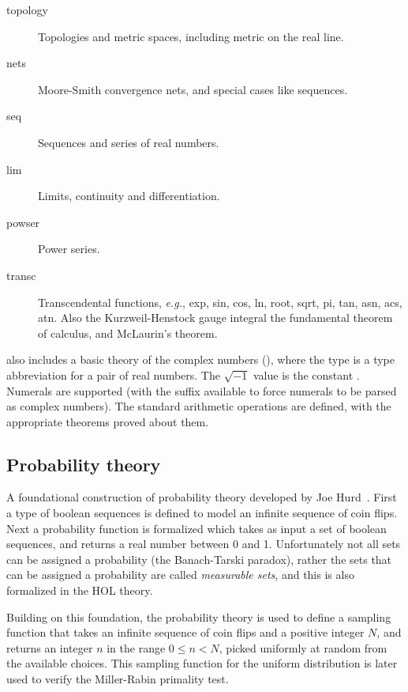 \begin{description}
\item [topology] Topologies and metric spaces, including metric on
the real line.
\item [nets] Moore-Smith convergence nets, and special cases like
sequences.
\item [seq] Sequences and series of real numbers.
\item [lim] Limits, continuity and differentiation.
\item [powser] Power series.
\item [transc] Transcendental functions, \emph{e.g.}, exp, sin,
cos, ln, root, sqrt, pi, tan, asn, acs, atn. Also the Kurzweil-Henstock
gauge integral the fundamental theorem of calculus, and McLaurin's
theorem.

\end{description}

\noindent
\HOL{} also includes a basic theory of the complex numbers (), where the type  is a type abbreviation for a pair of real numbers.
The $\sqrt{-1}$ value is the \HOL{} constant .
Numerals are supported (with the suffix  available to force numerals to be parsed as complex numbers).
The standard arithmetic operations are defined, with the appropriate theorems proved about them.

\subsection{Probability theory}\label{prob}

A foundational construction of probability theory developed by Joe
Hurd~\cite{hurd-thesis}. First a type of boolean sequences is defined
to model an infinite sequence of coin flips. Next a probability
function is formalized which takes as input a set of boolean
sequences, and returns a real number between 0 and 1. Unfortunately
not all sets can be assigned a probability (the Banach-Tarski
paradox), rather the sets that can be assigned a probability are
called \emph{measurable sets}, and this is also formalized in the
HOL theory.

Building on this foundation, the probability theory is used to define
a sampling function that takes an infinite sequence of coin flips and
a positive integer $N$, and returns an integer $n$ in the range $0\le
n < N$, picked uniformly at random from the available choices. This
sampling function for the uniform distribution is later used to verify
the Miller-Rabin primality test.

